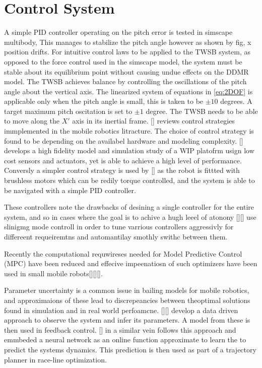     \section{Control System}
        A simple PID controller operating on the pitch error is tested in simscape multibody, 
        This manages to stabilize the pitch angle however as shown by fig, x position drifts. For intuitive control laws
        to be applied to the TWSB system, as opposed to the force control used in the simscape model, the system must 
        be stable about its equilibrium point without causing undue effects on the DDMR model.
        The TWSB achieves balance by controlling the oscillations of the pitch angle about the vertical axis. 
        The linearized system of equations in \ref{eq:2DOF} is applicable 
        only when the pitch angle is small, this is taken to be $±10$ degrees. 
        A target maximum pitch oscitation is set to $±1$ degree. 
        The TWSB needs to be able to move along the $X'$ axis in its inertial frame.
        [] reviews control strategies immplemented in the mobile robotics litracture. The choice 
        of control strategy is found to be depending on the availabel hardware and modeling complexity. 
        [] develops a high fidelity model and simulation study of a WIP platofrm usign low cost sensors and actuators, 
        yet is able to achieve a high level of performance. Conversly a simpler control strategy is used by [] as the robot is
        fittted with brushless motors which can be redily torque controlled, and the system is able to be 
        navigated with a simple PID controller.
        
        These controllers note the drawbacks of desining a single controller for the entire system, and so in cases
        where the goal is to achive a hugh leeel of atonony [][] use slinigmg mode controll in order to tune varrious controllers 
        aggressivly for differeent requeiremtns and automantilay smothly swithc between them.

        Recently the computational requwireses needed for Model Predictive Control (MPC) have been reduced and 
        effecive impeenatiosn of such optimizers have been used in small mobile robots[][][]. 
        
        Parameter uncertainty is a common issue in bailing models for mobile robotics, and approximaions of these lead to 
        discrepeancies between theoptimal solutions found in simulation and in real world perfoamcne. [][] develop a 
        data driven approach to observe the system and infer its parameters. A model from these is then used in feedback control. 
        [] in a similar vein follows this approach and emmbeded a neural network as an online function approximate to learn the to 
        predict the systems dynamics. This prediction is then used as part of a trajectory planner in race-line optimization. 



